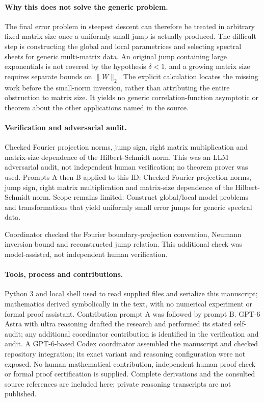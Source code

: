 \documentclass[11pt]{article}
\begin{document}
\paragraph{Why this does not solve the generic problem.}The final error problem in steepest descent can therefore be treated in arbitrary fixed matrix size once a uniformly small jump is actually produced. The difficult step is constructing the global and local parametrices and selecting spectral sheets for generic multi-matrix data. An original jump containing large exponentials is not covered by the hypothesis \(\delta<1\), and a growing matrix size requires separate bounds on \(\|W\|_2\). The explicit calculation locates the missing work before the small-norm inversion, rather than attributing the entire obstruction to matrix size. It yields no generic correlation-function asymptotic or theorem about the other applications named in the source.

\paragraph{Verification and adversarial audit.}
Checked Fourier projection norms, jump sign, right matrix multiplication and matrix-size dependence of the Hilbert-Schmidt norm. This was an LLM adversarial audit, not independent human verification; no theorem prover was used. Prompts A then B applied to this ID: Checked Fourier projection norms, jump sign, right matrix multiplication and matrix-size dependence of the Hilbert-Schmidt norm. Scope remains limited: Construct global/local model problems and transformations that yield uniformly small error jumps for generic spectral data.

Coordinator checked the Fourier boundary-projection convention, Neumann inversion bound and reconstructed jump relation. This additional check was model-assisted, not independent human verification.

\paragraph{Tools, process and contributions.}
Python 3 and local shell used to read supplied files and serialize this manuscript; mathematics derived symbolically in the text, with no numerical experiment or formal proof assistant. Contribution prompt A was followed by prompt B. GPT-6 Astra with ultra reasoning drafted the research and performed its stated self-audit; any additional coordinator contribution is identified in the verification and audit. A GPT-6-based Codex coordinator assembled the manuscript and checked repository integration; its exact variant and reasoning configuration were not exposed. No human mathematical contribution, independent human proof check or formal proof certification is supplied. Complete derivations and the consulted source references are included here; private reasoning transcripts are not published.
\end{document}
